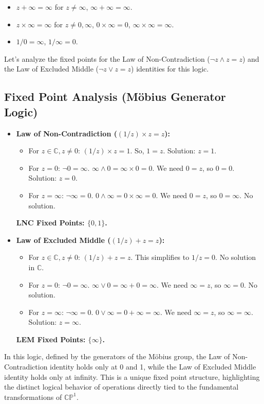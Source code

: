 \documentclass{article}
\begin{document}
	\begin{itemize}
		\item $z + \infty = \infty$ for $z \neq \infty$, $\infty + \infty = \infty$.
		\item $z \times \infty = \infty$ for $z \neq 0, \infty$, $0 \times \infty = 0$, $\infty \times \infty = \infty$.
		\item $1/0 = \infty$, $1/\infty = 0$.
	\end{itemize}
	Let's analyze the fixed points for the Law of Non-Contradiction ($\neg z \wedge z = z$) and the Law of Excluded Middle ($\neg z \vee z = z$) identities for this logic.
	
	\subsection{Fixed Point Analysis (M\"{o}bius Generator Logic)}
	
	\begin{itemize}
		\item \textbf{Law of Non-Contradiction ($(1/z) \times z = z$):}
		\begin{itemize}
			\item For $z \in \mathbb{C}, z \neq 0$: $(1/z) \times z = 1$. So, $1 = z$. Solution: $z=1$.
			\item For $z = 0$: $\neg 0 = \infty$. $\infty \wedge 0 = \infty \times 0 = 0$. We need $0 = z$, so $0 = 0$. Solution: $z=0$.
			\item For $z = \infty$: $\neg \infty = 0$. $0 \wedge \infty = 0 \times \infty = 0$. We need $0 = z$, so $0 = \infty$. No solution.
		\end{itemize}
		\textbf{LNC Fixed Points: $\{0, 1\}$.}
		
		\item \textbf{Law of Excluded Middle ($(1/z) + z = z$):}
		\begin{itemize}
			\item For $z \in \mathbb{C}, z \neq 0$: $(1/z) + z = z$. This simplifies to $1/z = 0$. No solution in $\mathbb{C}$.
			\item For $z = 0$: $\neg 0 = \infty$. $\infty \vee 0 = \infty + 0 = \infty$. We need $\infty = z$, so $\infty = 0$. No solution.
			\item For $z = \infty$: $\neg \infty = 0$. $0 \vee \infty = 0 + \infty = \infty$. We need $\infty = z$, so $\infty = \infty$. Solution: $z=\infty$.
		\end{itemize}
		\textbf{LEM Fixed Points: $\{\infty\}$.}
	\end{itemize}
	In this logic, defined by the generators of the M\"{o}bius group, the Law of Non-Contradiction identity holds only at 0 and 1, while the Law of Excluded Middle identity holds only at infinity. This is a unique fixed point structure, highlighting the distinct logical behavior of operations directly tied to the fundamental transformations of $\mathbb{CP}^1$.
	
\end{document}
